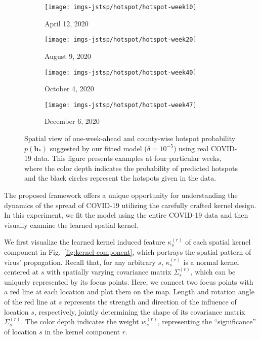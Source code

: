 \documentclass[journal]{IEEEtran}
\begin{document}
\begin{figure*}[!h]
\centering
\begin{subfigure}[h]{0.24\linewidth}
\texttt{[image: imgs-jstsp/hotspot/hotspot-week10]}
\caption{April 12, 2020}
\end{subfigure}
\begin{subfigure}[h]{0.24\linewidth}
\texttt{[image: imgs-jstsp/hotspot/hotspot-week20]}
\caption{August 9, 2020}
\end{subfigure}
\begin{subfigure}[h]{0.24\linewidth}
\texttt{[image: imgs-jstsp/hotspot/hotspot-week40]}
\caption{October 4, 2020}
\end{subfigure}
\begin{subfigure}[h]{0.24\linewidth}
\texttt{[image: imgs-jstsp/hotspot/hotspot-week47]}
\caption{December 6, 2020}
\end{subfigure}
\caption{Spatial view of one-week-ahead and county-wise hotspot probability $p(\mathbf{h}_*)$ suggested by our fitted model ($\delta = 10^{-5}$) using real COVID-19 data. This figure presents examples at four particular weeks, where the color depth indicates the probability of predicted hotspots and the black circles represent the hotspots given in the data.}
\label{fig:hotspot-map}
\end{figure*}

The proposed framework offers a unique opportunity for understanding the dynamics of the spread of COVID-19 utilizing the carefully crafted kernel design. In this experiment, we fit the model using the entire COVID-19 data and then visually examine the learned spatial kernel. 

We first visualize the learned kernel induced feature $\kappa_s^{(r)}$ of each spatial kernel component in Fig.~\ref{fig:kernel-component}, which portrays the spatial pattern of virus' propagation.
Recall that, for any arbitrary $s$, $\kappa^{(r)}_s$ is a normal kernel centered at $s$ with spatially varying covariance matrix $\Sigma^{(r)}_s$, which can be uniquely represented by its focus points. 
Here, we connect two focus points with a red line at each location and plot them on the map. 
Length and rotation angle of the red line at $s$ represents the strength and direction of the influence of location $s$, respectively, jointly determining the shape of its covariance matrix $\Sigma^{(r)}_s$. The color depth indicates the weight $w_s^{(r)}$, representing the ``significance'' of location $s$ in the kernel component $r$. 
\end{document}
